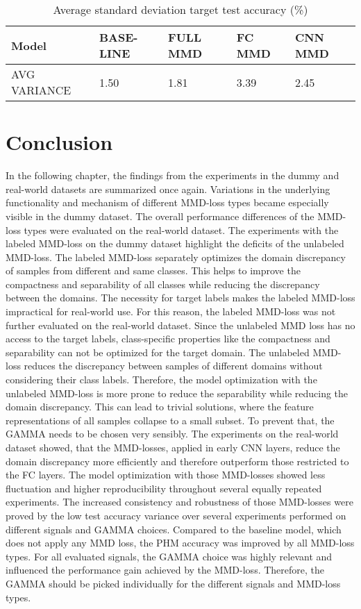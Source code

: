 \begin {table}[H]
\centering
\begin{tabular}{lllll}
  \toprule
  Model & BASE-LINE & FULL MMD & FC MMD & CNN MMD\\
  \midrule
  AVG VARIANCE & 1.50 & 1.81 & 3.39 & 2.45\\
  \bottomrule
\end{tabular}
\caption {Average standard deviation target test accuracy (\%)} \label{tab:Average_Variance_Accuracy} 
\end {table}

\section{Conclusion}\label{ch:Performance_overview}
In the following chapter, the findings from the experiments in the dummy and real-world datasets are summarized once again. Variations in the underlying functionality and mechanism of different MMD-loss types became especially visible in the dummy dataset. The overall performance differences of the MMD-loss types were evaluated on the real-world dataset. The experiments with the labeled MMD-loss on the dummy dataset highlight the deficits of the unlabeled MMD-loss. The labeled MMD-loss separately optimizes the domain discrepancy of samples from different and same classes. This helps to improve the compactness and separability of all classes while reducing the discrepancy between the domains. The necessity for target labels makes the labeled MMD-loss impractical for real-world use. For this reason, the labeled MMD-loss was not further evaluated on the real-world dataset. Since the unlabeled MMD loss has no access to the target labels, class-specific properties like the compactness and separability can not be optimized for the target domain. The unlabeled MMD-loss reduces the discrepancy between samples of different domains without considering their class labels. Therefore, the model optimization with the unlabeled MMD-loss is more prone to reduce the separability while reducing the domain discrepancy. This can lead to trivial solutions, where the feature representations of all samples collapse to a small subset. To prevent that, the GAMMA needs to be chosen very sensibly. The experiments on the real-world dataset showed, that the MMD-losses, applied in early CNN layers, reduce the domain discrepancy more efficiently and therefore outperform those restricted to the FC layers. The model optimization with those MMD-losses showed less fluctuation and higher reproducibility throughout several equally repeated experiments. The increased consistency and robustness of those MMD-losses were proved by the low test accuracy variance over several experiments performed on different signals and GAMMA choices. Compared to the baseline model, which does not apply any MMD loss, the PHM accuracy was improved by all MMD-loss types. For all evaluated signals, the GAMMA choice was highly relevant and influenced the performance gain achieved by the MMD-loss. Therefore, the GAMMA should be picked individually for the different signals and MMD-loss types. 